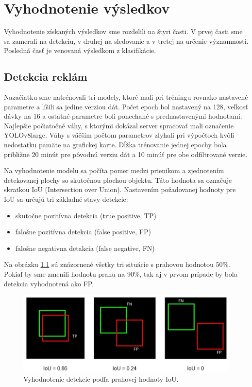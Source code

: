 \chapter{Vyhodnotenie výsledkov}\label{chap:results}

Vyhodnotenie získaných výsledkov sme rozdelili na štyri časti. V prvej časti sme sa zamerali na detekciu, v druhej na sledovanie a v tretej na určenie významnosti. Posledná časť je venovaná výsledkom z klasifikácie.

\section{Detekcia reklám}

Nazačiatku sme natrénovali tri modely, ktoré mali pri tréningu rovnako nastavené parametre a líšili sa jedine verziou dát. Počet epoch bol nastavený na 128, veľkosť dávky na 16 a ostatné parametre boli ponechané s prednastavenými hodnotami. Najlepšie počiatočné váhy, s ktorými dokázal server spracovať mali označenie YOLOv8large. Váhy s väčším počtom parametrov zlyhali pri výpočtoch kvôli nedostatku pamäte na grafickej karte. Dĺžka trénovanie jednej epochy bola približne 20 minút pre pôvodnú verziu dát a 10 minúť pre obe odfiltrované verzie.

Na vyhodnotenie modelu sa počíta pomer medzi prienikom a zjednotením detekovanej plochy so skutočnou plochou objektu. Táto hodnota sa označuje skratkou IoU (Intersection over Union). Nastavením požadovanej hodnoty pre IoU sa určujú tri základné stavy detekcie:

\begin{itemize}
  \item skutočne pozitívna detekcia (true positive, TP)
  \item falošne pozitívna detekcia (false positive, FP)
  \item falošne negativna detakcia (false negative, FN)
\end{itemize}

Na obrázku \ref{img:ious} sú znázornené všetky tri situácie s prahovou hodnotou 50\%. Pokiaľ by sme zmenili hodnotu prahu na 90\%, tak aj v prvom prípade by bola detekcia vyhodnotená ako FP.

\begin{figure}[ht]
    \centering
    \includegraphics[width=1\textwidth]{images/05/ious.png}
    \caption{Vyhodnotenie detekcie podľa prahovej hodnoty IoU.}
    \label{img:ious}
\end{figure}

